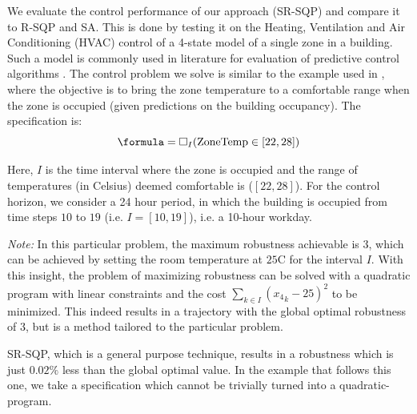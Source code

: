 
We evaluate the control performance of our approach (SR-SQP) and compare it to R-SQP and SA. %
This is done by testing it on the Heating, Ventilation and Air Conditioning (HVAC) control of a 4-state model of a single zone in a building. Such a model is commonly used in literature for evaluation of predictive control algorithms \cite{Jain2016}. The control problem we solve is similar to the example used in \cite{Raman14_MPCSTL}, where the objective is to bring the zone temperature to a comfortable range when the zone is occupied (given predictions on the building occupancy). The specification is:
\begin{equation}
\label{eq:BldgSpec}
\formula = \always_I(\text{ZoneTemp} \in [22,28])
\end{equation}

Here, $I$ is the time interval where the zone is occupied and the range of temperatures (in Celsius) deemed comfortable is ($[22,28]$). For the control horizon, we consider a 24 hour period, in which the building is occupied from time steps $10$ to $19$ (i.e. $I=[10,19]$), i.e. a 10-hour workday. 

\textit{Note:} In this particular problem, the maximum robustness achievable is $3$, which can be achieved by setting the room temperature at $25$C for the interval $I$. 
With this insight, the problem of maximizing robustness can be solved with a quadratic program with linear constraints and the cost $\sum_{k \in I}({x_4}_k-25)^2$ to be minimized. This indeed results in a trajectory with the global optimal robustness of $3$, but is a method tailored to the particular problem. 

SR-SQP, which is a general purpose technique, results in a robustness which is just $0.02\%$ less than the global optimal value. In the example that follows this one, we take a specification which cannot be trivially turned into a quadratic-program.

